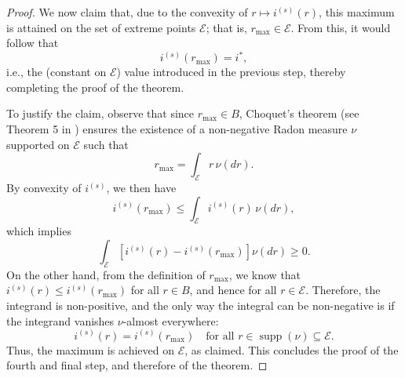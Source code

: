 \documentclass[a4paper, 11pt]{article}
\theoremstyle{definition}
\begin{document}
{\begin{proof}
We now claim that, due to the convexity of \( r \mapsto i^{(s)}(r) \), this maximum is attained on the set of extreme points \( \mathcal{E} \); that is, \( r_{\max} \in \mathcal{E} \). From this, it would follow that
\[
i^{(s)}(r_{\max}) = i^{*},
\]
i.e., the (constant on $\mathcal{E}$) value introduced in the previous step, thereby completing the proof of the theorem. 

To justify the claim, observe that since \( r_{\max} \in B \), Choquet’s theorem (see Theorem 5 in \cite{amorino2025factorization}) ensures the existence of a non-negative Radon measure \( \nu \) supported on \( \mathcal{E} \) such that
\[
r_{\max} = \int_\mathcal{E} r \, \nu(dr).
\]
By convexity of \( i^{(s)} \), we then have
\[
i^{(s)}(r_{\max}) \le \int_\mathcal{E} i^{(s)}(r) \, \nu(dr),
\]
which implies
\[
\int_\mathcal{E} \left[i^{(s)}(r) - i^{(s)}(r_{\max})\right] \nu(dr) \ge 0.
\]
On the other hand, from the definition of \( r_{\max} \), we know that \( i^{(s)}(r) \le i^{(s)}(r_{\max}) \) for all \( r \in B \), and hence for all \( r \in \mathcal{E} \). Therefore, the integrand is non-positive, and the only way the integral can be non-negative is if the integrand vanishes \(\nu\)-almost everywhere:
\[
i^{(s)}(r) = i^{(s)}(r_{\max}) \quad \text{for all } r \in \operatorname{supp}(\nu) \subseteq \mathcal{E}.
\]
Thus, the maximum is achieved on \( \mathcal{E} \), as claimed. This concludes the proof of the fourth and final step, and therefore of the theorem.


\end{proof}


}
\end{document}
